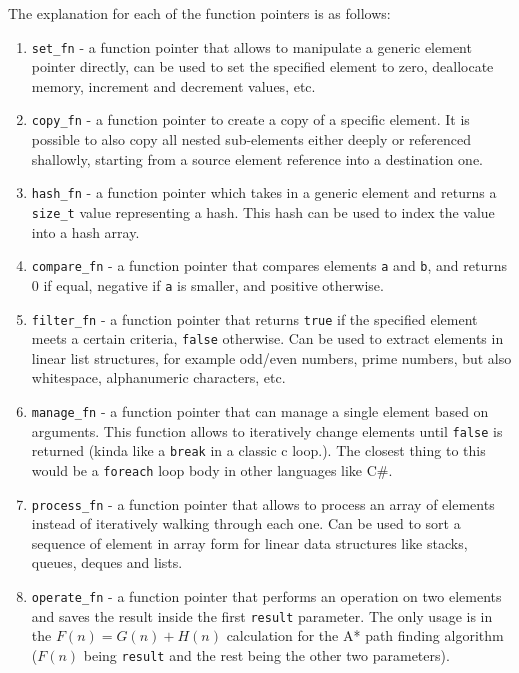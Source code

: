 The explanation for each of the function pointers is as follows:
\begin{enumerate}
    \item \texttt{set\_fn} - a function pointer that allows to manipulate a generic element pointer directly, can be used to set the specified element to zero, deallocate memory, increment and decrement values, etc.
    \item \texttt{copy\_fn} - a function pointer to create a copy of a specific element. It is possible to also copy all nested sub-elements either deeply or referenced shallowly, starting from a source element reference into a destination one.
    \item \texttt{hash\_fn} - a function pointer which takes in a generic element and returns a \texttt{size\_t} value representing a hash. This hash can be used to index the value into a hash array.
    \item \texttt{compare\_fn} - a function pointer that compares elements \texttt{a} and \texttt{b}, and returns 0 if equal, negative if \texttt{a} is smaller, and positive otherwise.
    \item \texttt{filter\_fn} - a function pointer that returns \texttt{true} if the specified element meets a certain criteria, \texttt{false} otherwise. Can be used to extract elements in linear list structures, for example odd/even numbers, prime numbers, but also whitespace, alphanumeric characters, etc.
    \item \texttt{manage\_fn} - a function pointer that can manage a single element based on arguments. This function allows to iteratively change elements until \texttt{false} is returned (kinda like a \texttt{break} in a classic c loop.). The closest thing to this would be a \texttt{foreach} loop body in other languages like C\#.
    \item \texttt{process\_fn} - a function pointer that allows to process an array of elements instead of iteratively walking through each one. Can be used to sort a sequence of element in array form for linear data structures like stacks, queues, deques and lists.
    \item \texttt{operate\_fn} - a function pointer that performs an operation on two elements and saves the result inside the first \texttt{result} parameter. The only usage is in the \(F(n) = G(n) + H(n)\) calculation for the A* path finding algorithm (\(F(n)\) being \texttt{result} and the rest being the other two parameters).
\end{enumerate}

